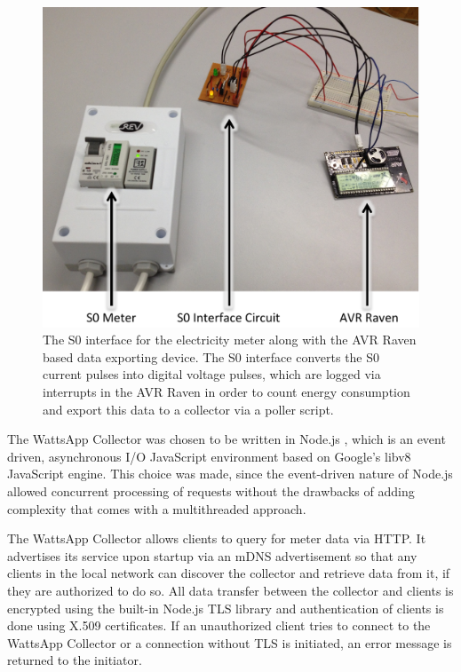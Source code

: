 \documentclass[10pt, conference, compsocconf]{IEEEtran}
\begin{document}
\begin{figure}[t]
\begin{centering}
\includegraphics[scale=0.4]{images/s0-meter} 
\par\end{centering}

\caption{The S0 interface for the electricity meter along with the AVR Raven
based data exporting device. The S0 interface converts the S0 current
pulses into digital voltage pulses, which are logged via interrupts
in the AVR Raven in order to count energy consumption and export this
data to a collector via a poller script.\label{fig:meter-overview}}
\end{figure}

The WattsApp Collector was chosen to be written in Node.js \cite{nodejs:2010},
which is an event driven, asynchronous I/O JavaScript environment
based on Google's libv8 JavaScript engine. This choice was made, since
the event-driven nature of Node.js allowed concurrent processing of
requests without the drawbacks of adding complexity that comes with
a multithreaded approach.

The WattsApp Collector allows clients to query for meter data via
HTTP. It advertises its service upon startup via an mDNS advertisement
so that any clients in the local network can discover the collector
and retrieve data from it, if they are authorized to do so. All data
transfer between the collector and clients is encrypted using the
built-in Node.js TLS library and authentication of clients is done
using X.509 certificates. If an unauthorized client tries to connect
to the WattsApp Collector or a connection without TLS is initiated,
an error message is returned to the initiator.
\end{document}
